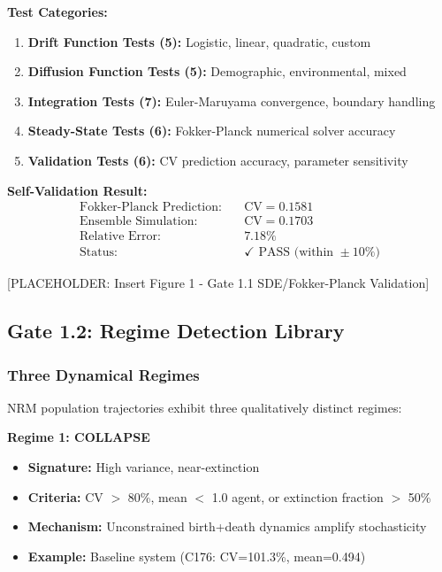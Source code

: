 \documentclass[11pt]{article}
\newcommand{\cv}{\text{CV}}
\begin{document}
\textbf{Test Categories:}
\begin{enumerate}
\item \textbf{Drift Function Tests (5):} Logistic, linear, quadratic, custom
\item \textbf{Diffusion Function Tests (5):} Demographic, environmental, mixed
\item \textbf{Integration Tests (7):} Euler-Maruyama convergence, boundary handling
\item \textbf{Steady-State Tests (6):} Fokker-Planck numerical solver accuracy
\item \textbf{Validation Tests (6):} CV prediction accuracy, parameter sensitivity
\end{enumerate}

\textbf{Self-Validation Result:}
\begin{align*}
\text{Fokker-Planck Prediction:} & \quad \cv = 0.1581 \\
\text{Ensemble Simulation:} & \quad \cv = 0.1703 \\
\text{Relative Error:} & \quad 7.18\% \\
\text{Status:} & \quad \checkmark \text{ PASS (within } \pm 10\%)
\end{align*}

[PLACEHOLDER: Insert Figure 1 - Gate 1.1 SDE/Fokker-Planck Validation]

\subsection{Gate 1.2: Regime Detection Library}

\subsubsection{Three Dynamical Regimes}

NRM population trajectories exhibit three qualitatively distinct regimes:

\textbf{Regime 1: COLLAPSE}
\begin{itemize}
\item \textbf{Signature:} High variance, near-extinction
\item \textbf{Criteria:} CV $>$ 80\%, mean $<$ 1.0 agent, or extinction fraction $>$ 50\%
\item \textbf{Mechanism:} Unconstrained birth+death dynamics amplify stochasticity
\item \textbf{Example:} Baseline system (C176: CV=101.3\%, mean=0.494)
\end{itemize}
\end{document}
